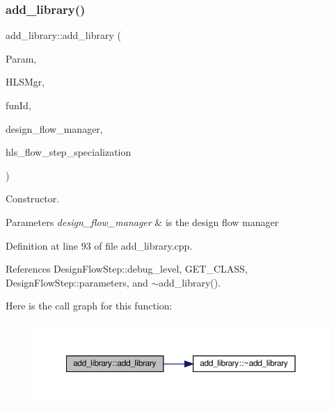 \subsubsection{\texorpdfstring{add\+\_\+library()}{add\_library()}}
{\footnotesize\ttfamily add\+\_\+library\+::add\+\_\+library (\begin{DoxyParamCaption}\item[{const \hyperlink{Parameter_8hpp_a37841774a6fcb479b597fdf8955eb4ea}{Parameter\+Const\+Ref}}]{Param,  }\item[{const \hyperlink{hls__manager_8hpp_acd3842b8589fe52c08fc0b2fcc813bfe}{H\+L\+S\+\_\+manager\+Ref}}]{H\+L\+S\+Mgr,  }\item[{unsigned int}]{fun\+Id,  }\item[{const Design\+Flow\+Manager\+Const\+Ref}]{design\+\_\+flow\+\_\+manager,  }\item[{const \hyperlink{hls__step_8hpp_a5fdd2edf290c196531d21d68e13f0e74}{H\+L\+S\+Flow\+Step\+Specialization\+Const\+Ref}}]{hls\+\_\+flow\+\_\+step\+\_\+specialization }\end{DoxyParamCaption})}



Constructor. 


\begin{DoxyParams}{Parameters}
{\em design\+\_\+flow\+\_\+manager} & is the design flow manager \\
\hline
\end{DoxyParams}


Definition at line 93 of file add\+\_\+library.\+cpp.



References Design\+Flow\+Step\+::debug\+\_\+level, G\+E\+T\+\_\+\+C\+L\+A\+SS, Design\+Flow\+Step\+::parameters, and $\sim$add\+\_\+library().

Here is the call graph for this function\+:
\nopagebreak
\begin{figure}[H]
\begin{center}
\leavevmode
\includegraphics[width=350pt]{d6/d81/classadd__library_a6633753f977e754dcb60f0391be7d37d_cgraph}
\end{center}
\end{figure}
\mbox{\label{classadd__library_a9d78e992d068a1be66af1b3c49f7adcb}} 
